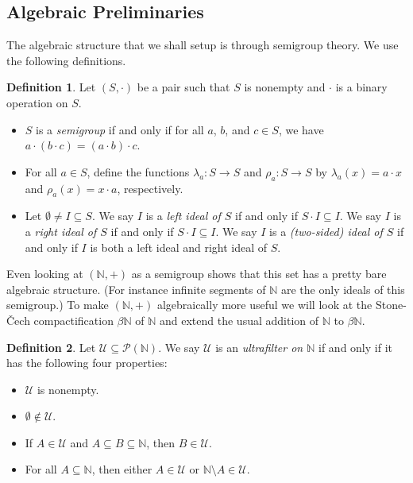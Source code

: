 \documentclass[12pt]{article}
\theoremstyle{plain}
\theoremstyle{definition}
\newtheorem*{defn}{Definition}
\newcommand{\bbN}{\mathbb{N}}
\begin{document}
\subsection{Algebraic Preliminaries}
The algebraic structure that we shall setup is through semigroup
theory.
We use the following definitions.
  \begin{defn}
    Let $(S, \cdot)$ be a pair such that $S$ is nonempty and $\cdot$ is a
    binary operation on $S$.
      \begin{itemize}
        \item[(a)] $S$ is a \textsl{semigroup} if and only if for all
          $a$, $b$, and $c \in S$, we have $a \cdot (b \cdot c) = (a
          \cdot b) \cdot c$.
        \item[(b)] For all $a \in S$, define the functions $\lambda_a
          : S \to S$ and $\rho_a : S \to S$ by $\lambda_a(x) = a\cdot
          x$ and $\rho_a(x) = x\cdot a$, respectively.
        \item[(c)] Let $\emptyset \ne I \subseteq S$.
          We say $I$ is a \textsl{left ideal of $S$} if and only if
          $S\cdot I \subseteq I$.
          We say $I$ is a \textsl{right ideal of $S$} if and only if
          $S\cdot I \subseteq I$.
          We say $I$ is a \textsl{(two-sided) ideal of $S$} if and only if
          $I$ is both a left ideal and right ideal of $S$.
      \end{itemize}
  \end{defn}
Even looking at $(\bbN, +)$ as a semigroup shows that this set has a
pretty bare algebraic structure. 
(For instance infinite segments of $\bbN$ are the only ideals of this
semigroup.)
To make $(\bbN, +)$ algebraically more useful we will look at the
Stone-\v{C}ech compactification $\beta\bbN$ of $\bbN$ and extend the
usual addition of $\bbN$ to $\beta\bbN$.

  \begin{defn}
    Let $\mathcal{U} \subseteq \mathcal{P}(\bbN)$.
    We say $\mathcal{U}$ is an \textsl{ultrafilter on $\bbN$} if and
    only if it has the following four properties:
      \begin{itemize}
        \item[(1)] $\mathcal{U}$ is nonempty.
        \item[(2)] $\emptyset \not\in \mathcal{U}$. 
        \item[(3)] If $A \in \mathcal{U}$ and $A \subseteq B \subseteq
          \bbN$, then $B \in \mathcal{U}$.
        \item[(4)] For all $A \subseteq \bbN$, then either $A \in
          \mathcal{U}$ or $\bbN \setminus A \in \mathcal{U}$.
      \end{itemize}
  \end{defn}
\end{document}
